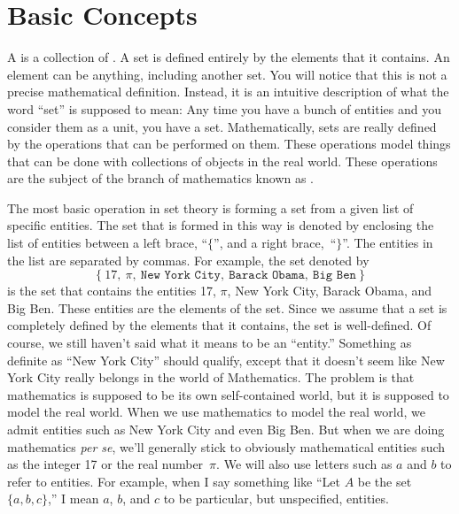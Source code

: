 \section{Basic Concepts}\label{S-sets-1}

A  is a collection of .
A set is defined entirely by the elements that it contains.
An element can be anything, including another set.  You will notice
that this is not a precise mathematical definition.  Instead, it is
an intuitive description of what the word ``set'' is supposed to mean:
Any time you have a bunch of entities and you consider them as a unit,
you have a set.  Mathematically, sets are really defined by the operations
that can be performed on them.  These operations model things that
can be done with collections of objects in the real world.  These operations
are the subject of the branch of mathematics known as .

The most basic operation in set theory is forming a set from a given
list of specific entities.  The set that is formed in this way is denoted
by enclosing the list of entities between  a left brace, ``$\{$'', and
a right brace,~``$\}$''.  The entities in the list are separated by
commas.  For example, the set denoted by
\[\{\ 17,\ \pi,\ \texttt{New York City},\ \texttt{Barack Obama},\ \texttt{Big Ben}\ \}\]
is the set that contains the entities 17, $\pi$, New York City, Barack Obama,
and Big Ben.  These entities are the elements of the set.  Since we assume
that a set is completely defined by the elements that it contains, the
set is well-defined.  Of course, we still haven't said what it means to
be an ``entity.''  Something as definite as ``New York City'' should qualify,
except that it doesn't seem like New York City really belongs in the world
of Mathematics.  The problem is that mathematics is supposed to be its own
self-contained world, but it is supposed to model the real world.  When we 
use mathematics to model the real world, we admit entities such as New
York City and even Big Ben.  But when we are doing mathematics {\it per se},
we'll generally stick to obviously mathematical entities such as the
integer 17 or the real number~$\pi$.  We will also use letters such
as $a$ and $b$ to refer to entities.  For example, when I say
something like ``Let $A$ be the set $\{a,b,c\}$,'' I mean $a$, $b$, and
$c$ to be particular, but unspecified, entities.

